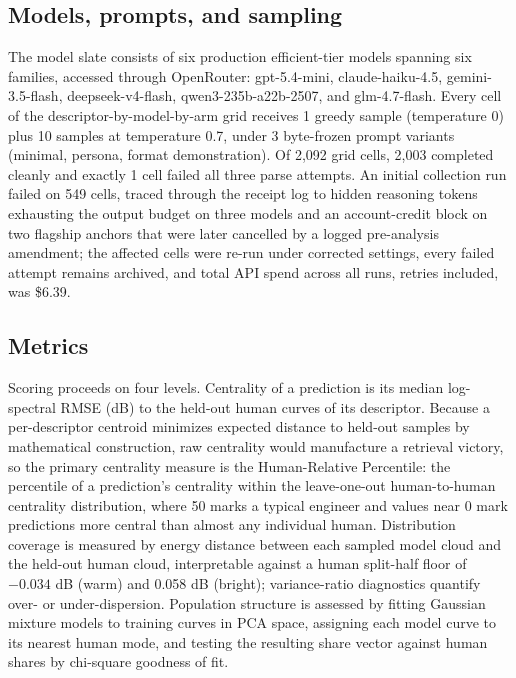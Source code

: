 \documentclass[11pt]{article}
\begin{document}
\subsection{Models, prompts, and sampling}

The model slate consists of six production efficient-tier models spanning six families, accessed through OpenRouter: gpt-5.4-mini, claude-haiku-4.5, gemini-3.5-flash, deepseek-v4-flash, qwen3-235b-a22b-2507, and glm-4.7-flash. Every cell of the descriptor-by-model-by-arm grid receives 1 greedy sample (temperature 0) plus 10 samples at temperature 0.7, under 3 byte-frozen prompt variants (minimal, persona, format demonstration). Of 2,092 grid cells, 2,003 completed cleanly and exactly 1 cell failed all three parse attempts. An initial collection run failed on 549 cells, traced through the receipt log to hidden reasoning tokens exhausting the output budget on three models and an account-credit block on two flagship anchors that were later cancelled by a logged pre-analysis amendment; the affected cells were re-run under corrected settings, every failed attempt remains archived, and total API spend across all runs, retries included, was \$6.39.

\subsection{Metrics}

Scoring proceeds on four levels. Centrality of a prediction is its median log-spectral RMSE (dB) to the held-out human curves of its descriptor. Because a per-descriptor centroid minimizes expected distance to held-out samples by mathematical construction, raw centrality would manufacture a retrieval victory, so the primary centrality measure is the Human-Relative Percentile: the percentile of a prediction's centrality within the leave-one-out human-to-human centrality distribution, where 50 marks a typical engineer and values near 0 mark predictions more central than almost any individual human. Distribution coverage is measured by energy distance between each sampled model cloud and the held-out human cloud, interpretable against a human split-half floor of $-0.034$ dB (warm) and 0.058 dB (bright); variance-ratio diagnostics quantify over- or under-dispersion. Population structure is assessed by fitting Gaussian mixture models to training curves in PCA space, assigning each model curve to its nearest human mode, and testing the resulting share vector against human shares by chi-square goodness of fit.
\end{document}
